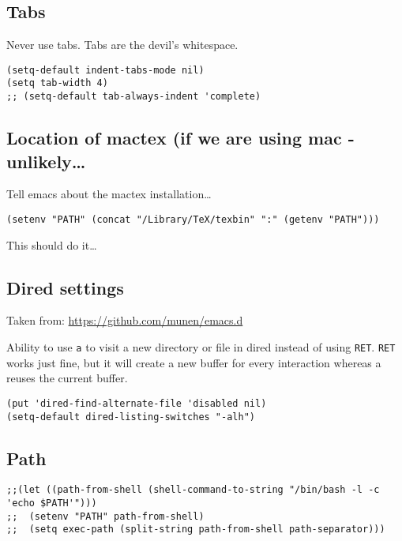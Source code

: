 \documentclass[12pt]{article}
\begin{document}
\subsection{Tabs}
\label{sec:org52cfe1d}
Never use tabs. Tabs are the devil’s whitespace.

\begin{verbatim}
(setq-default indent-tabs-mode nil)
(setq tab-width 4)
;; (setq-default tab-always-indent 'complete)
\end{verbatim}

\subsection{Location of mactex (if we are using mac - unlikely\ldots{}}
\label{sec:org30b1831}
Tell emacs about the mactex installation\ldots{}

\begin{verbatim}
(setenv "PATH" (concat "/Library/TeX/texbin" ":" (getenv "PATH")))
\end{verbatim}

This should do it\ldots{}

\subsection{Dired settings}
\label{sec:orgd442a06}

Taken from: \url{https://github.com/munen/emacs.d}


Ability to use \texttt{a} to visit a new directory or file in dired instead of using \texttt{RET}.
\texttt{RET} works just fine, but it will create a new buffer for every interaction
whereas a reuses the current buffer.

\begin{verbatim}
(put 'dired-find-alternate-file 'disabled nil)
(setq-default dired-listing-switches "-alh")
\end{verbatim}

\subsection{Path}
\label{sec:org5e0225d}

\begin{verbatim}
;;(let ((path-from-shell (shell-command-to-string "/bin/bash -l -c 'echo $PATH'")))
;;  (setenv "PATH" path-from-shell)
;;  (setq exec-path (split-string path-from-shell path-separator)))

\end{verbatim}
\end{document}
